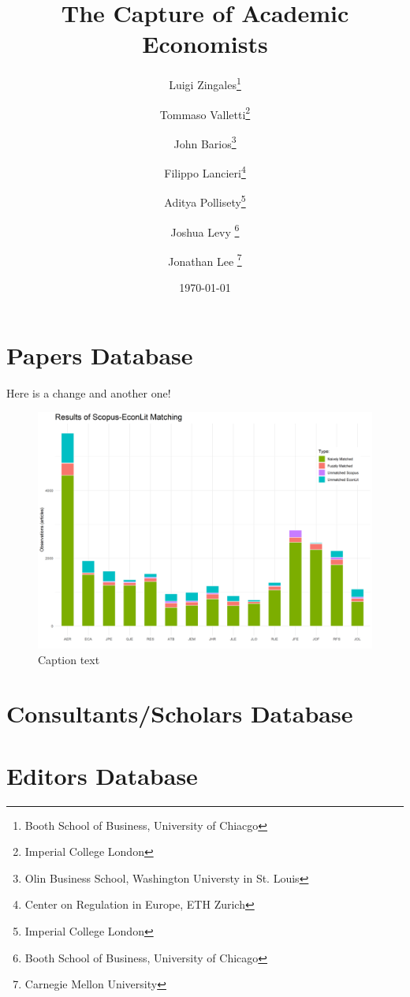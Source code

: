 \documentclass[11pt, letterpaper, twoside]{article}
\title{\singlespacing\textbf{The Capture of Academic Economists}}
\author{
    Luigi Zingales\thanks{Booth School of Business, University of Chiacgo} \\
    \and
    Tommaso Valletti\thanks{Imperial College London}\\
    \and
    John Barios\thanks{Olin Business School, Washington Universty in St. Louis}\\
    \and
    Filippo Lancieri\thanks{Center on Regulation in Europe, ETH Zurich} \\
    \and
    Aditya Pollisety\thanks{Imperial College London}\\
    \and
    Joshua Levy \thanks{Booth School of Business, University of Chicago}\\
    \and
    Jonathan Lee \thanks{Carnegie Mellon University}
    }
\date{\today}
\begin{document}
\begin{titlepage}
    \maketitle
    \thispagestyle{empty}
\end{titlepage}


\newpage
{}

\section{Papers Database}


Here is a change and another one!



\begin{figure}[h]
    \centering    
    \includegraphics[width=\textwidth]{figures/scopus_econlit_matching_results.png}
    \caption{Caption text}
\end{figure}




\section{Consultants/Scholars Database}


\section{Editors Database}
\end{document}
